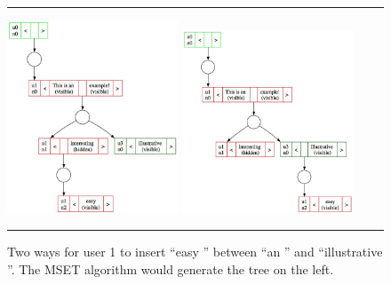 \documentclass{amsart}
\begin{document}
\begin{figure}[h]
\vspace{\baselineskip}
  \hspace{\fill}\rule{\linewidth}{.7pt}\hspace{\fill}
  \vspace{\baselineskip}

\centering
\includegraphics[width=2in]{tree14b.jpg}
\includegraphics[width=2in]{tree14a.jpg}
\caption{Two ways for user 1 to insert ``easy '' 
between ``an '' and ``illustrative ''. The MSET algorithm
would generate the tree on the left. \label{fig:tree14a}}

\vspace{\baselineskip}%
  \hspace{\fill}\rule{\linewidth}{.7pt}\hspace{\fill}%
\vspace{\baselineskip}%
\end{figure}
\end{document}
